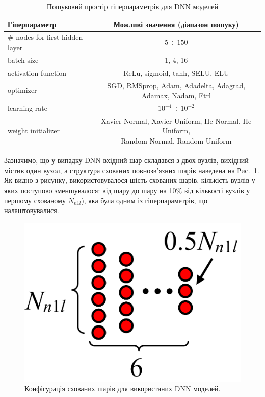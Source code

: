 \documentclass[12pt,a4paper,titlepage,oneside]{book}
\numberwithin{equation}{part}
\begin{document}
\begin{table}[!ht]
\caption{Пошуковий простір гіперпараметрів для DNN моделей }
\label{tblDNNs}
\centering
\begin{tabular}{|l|c|}
\hline
Гіперпараметр&Можливі значення (діапазон пошуку)\\
\hline
\# nodes for first hidden layer &$5\div150$\\
\hline
batch size&	1, 4, 16\\
\hline
activation function &	ReLu, sigmoid, tanh, SELU, ELU\\
\hline
optimizer	&SGD, RMSprop, Adam, Adadelta, Adagrad, Adamax, Nadam, Ftrl\\
\hline
learning rate	& $10^{-4}\div10^{-2}$ \\
\hline
weight initializer &	\makecell{Xavier Normal, Xavier Uniform, He Normal, He Uniform, \\Random Normal, Random Uniform}\\
\hline
\end{tabular}
\end{table}

Зазначимо, що у випадку DNN вхідний шар складався з двох вузлів, вихідний містив один вузол,
а структура схованих повнозв'язних шарів наведена на Рис.~\ref{figDNNc}.
Як видно з рисунку, використовувалося шість схованих шарів, кількість вузлів у яких поступово зменшувалося:
від шару до шару на 10\% від кількості вузлів у першому схованому $N_{n1l}$), яка була одним із гіперпараметрів, що налаштовувалися.


\begin{figure}
	\centering
     \includegraphics[width=0.5\linewidth]{Fig22.png}
	  \caption{Конфігурація схованих шарів для використаних DNN моделей.
}\label{figDNNc}
\end{figure}
\end{document}
